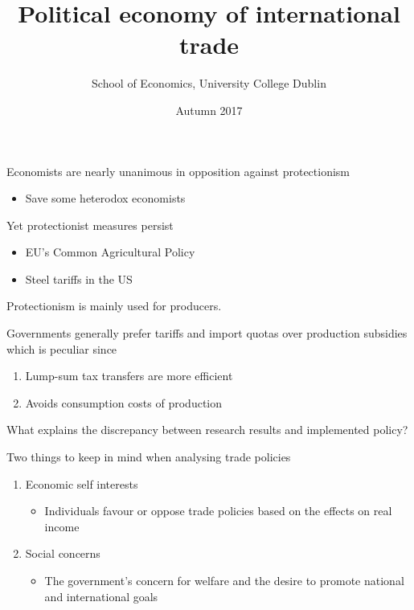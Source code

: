 \documentclass{beamer}
\title{Political economy of international trade}
\author{School of Economics, University College Dublin}
\date{Autumn 2017}
\begin{document}
\begin{frame}
\titlepage  
\end{frame}

\begin{frame}
  Economists are nearly unanimous in opposition against protectionism
  \begin{itemize}
    \item Save some heterodox economists
  \end{itemize}
  \medskip
  Yet protectionist measures persist 
  \begin{itemize}
    \item EU's Common Agricultural Policy
    \item Steel tariffs in the US
  \end{itemize}  
  \medskip
  Protectionism is mainly used for producers.   
\end{frame}

\begin{frame}
Governments generally prefer tariffs and import quotas over production subsidies which is peculiar since
  \begin{enumerate}
    \item Lump-sum tax transfers are more efficient
    \item Avoids consumption costs of production
  \end{enumerate}
  \medskip
  What explains the discrepancy between research results and implemented policy?
\end{frame}

\begin{frame}
  Two things to keep in mind when analysing trade policies  
  \begin{enumerate}
    \item Economic self interests
    \begin{itemize}
      \item Individuals favour or oppose trade policies based on the effects on real income
    \end{itemize}
    \item Social concerns
    \begin{itemize}
      \item The government's concern for welfare and the desire to promote national and international goals
    \end{itemize}
  \end{enumerate}
\end{frame}
\end{document}
